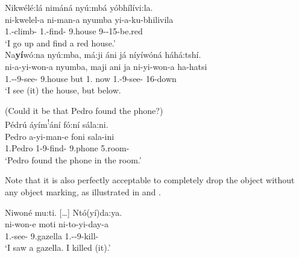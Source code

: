 \documentclass[output=paper]{langscibook}
\begin{document}
\ea
\begin{xlist}
\label{bkm:Ref127267749}
Nikwélé:lá nimáná nyú:mbá yóbhílívi:la.\\
\gll
ni-kwelel-a  ni-man-a  nyumba  yi-a-ku-bhilivila\\
1\SG.\SM{}-climb-\FV{}  1\SG.\SM{}-find-\FV{}  9.house  9-\CONN{}-15-be.red\\
\glt
‘I go up and find a red house.’\\

Na\textbf{yí}wó:na nyú:mba, má:ji áni já níyíwóná háhá:tshí.\\
\gll
ni-a-yi-won-a  nyumba,  maji  ani  ja  ni-yi-won-a  ha-hatsi\\
1\SG.\SM{}-\DJ{}-9\OM{}-see-\FV{}  9.house  but  1\SG{}.\PRO{}  now  1\SG.\SM{}-9\OM{}-see-\FV{}  16-down\\
\glt
‘I see (it) the house, but below.

\end{xlist}

\ex
\label{bkm:Ref127267750}
(Could it be that Pedro found the phone?)\\
Pédrú áyím\textsuperscript{!}ání fó:ní sála:ni.\\
\gll
Pedro  a-yi-man-e  foni  sala-ini\\
1.Pedro  1\SM{}-9\OM{}-find-\PFV{}  9.phone  5.room-\LOC{}\\
\glt
‘Pedro found the phone in the room.’\\

\z

Note that it is also perfectly acceptable to completely drop the object without any object marking, as illustrated in  and .

\ea
\label{bkm:Ref124153589}
Niwoné mu:ti. […] Ntó(yí)da:ya.\\
\gll
ni-won-e  moti  ni-to-yi-day-a\\
1\SG.\SM{}-see-\PFV{}  9.gazella  1\SG.\SM{}-\TO{}-9\OM{}-kill-\FV{}\\
\glt
‘I saw a gazella. I killed (it).’\\

\z
\end{document}
